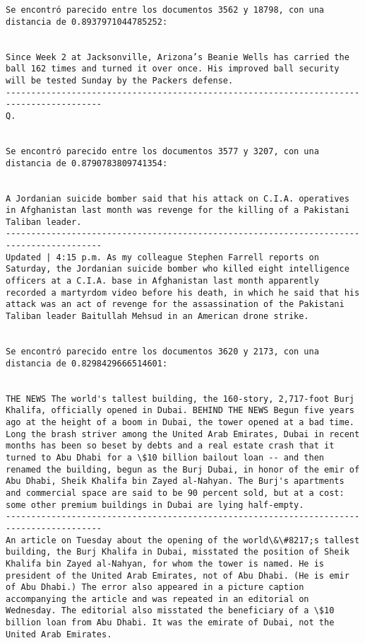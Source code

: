 \documentclass[11pt]{article}
\begin{document}
\begin{Verbatim}[commandchars=\\\{\}]
Se encontró parecido entre los documentos 3562 y 18798, con una distancia de 0.8937971044785252:


Since Week 2 at Jacksonville, Arizona’s Beanie Wells has carried the ball 162 times and turned it over once. His improved ball security will be tested Sunday by the Packers defense.
-----------------------------------------------------------------------------------------
Q.


Se encontró parecido entre los documentos 3577 y 3207, con una distancia de 0.8790783809741354:


A Jordanian suicide bomber said that his attack on C.I.A. operatives in Afghanistan last month was revenge for the killing of a Pakistani Taliban leader.
-----------------------------------------------------------------------------------------
Updated | 4:15 p.m. As my colleague Stephen Farrell reports on Saturday, the Jordanian suicide bomber who killed eight intelligence officers at a C.I.A. base in Afghanistan last month apparently recorded a martyrdom video before his death, in which he said that his attack was an act of revenge for the assassination of the Pakistani Taliban leader Baitullah Mehsud in an American drone strike.


Se encontró parecido entre los documentos 3620 y 2173, con una distancia de 0.8298429666514601:


THE NEWS The world's tallest building, the 160-story, 2,717-foot Burj Khalifa, officially opened in Dubai. BEHIND THE NEWS Begun five years ago at the height of a boom in Dubai, the tower opened at a bad time. Long the brash striver among the United Arab Emirates, Dubai in recent months has been so beset by debts and a real estate crash that it turned to Abu Dhabi for a \$10 billion bailout loan -- and then renamed the building, begun as the Burj Dubai, in honor of the emir of Abu Dhabi, Sheik Khalifa bin Zayed al-Nahyan. The Burj's apartments and commercial space are said to be 90 percent sold, but at a cost: some other premium buildings in Dubai are lying half-empty.
-----------------------------------------------------------------------------------------
An article on Tuesday about the opening of the world\&\#8217;s tallest building, the Burj Khalifa in Dubai, misstated the position of Sheik Khalifa bin Zayed al-Nahyan, for whom the tower is named. He is president of the United Arab Emirates, not of Abu Dhabi. (He is emir of Abu Dhabi.) The error also appeared in a picture caption accompanying the article and was repeated in an editorial on Wednesday. The editorial also misstated the beneficiary of a \$10 billion loan from Abu Dhabi. It was the emirate of Dubai, not the United Arab Emirates.



\end{Verbatim}
\end{document}
